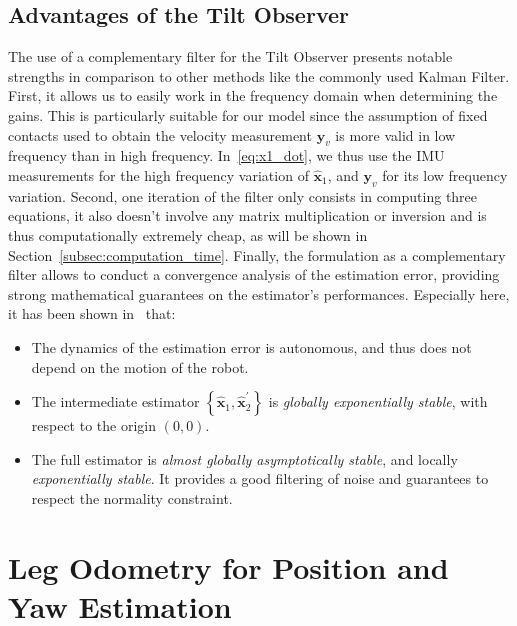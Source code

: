 \documentclass{IJCAS}
\begin{document}
\subsection{Advantages of the Tilt Observer}
The use of a complementary filter for the Tilt Observer presents notable strengths in comparison to other methods like the commonly used Kalman Filter. First, it allows us to easily work in the frequency domain when determining the gains. This is particularly suitable for our model since the assumption of fixed contacts used to obtain the velocity measurement $\boldsymbol{y}_v$ is more valid in low frequency than in high frequency. In~\eqref{eq:x1_dot}, we thus use the IMU measurements for the high frequency variation of $\hat{\boldsymbol{x}}_{1}$, and $\boldsymbol{y}_v$ for its low frequency variation. Second, one iteration of the filter only consists in computing three equations, it also doesn't involve any matrix multiplication or inversion and is thus computationally extremely cheap, as will be shown in Section~\ref{subsec:computation_time}. Finally, the formulation as a complementary filter allows to conduct a convergence analysis of the estimation error, providing strong mathematical guarantees on the estimator's performances. Especially here, it has been shown in~\cite{benallegue2020LyapunovStableOrientationEstimatorHumanoids} that:
\begin{itemize}
    \item The dynamics of the estimation error is autonomous, and thus does not depend on the motion of the robot. 
    \item The intermediate estimator $\left\{\hat{\boldsymbol{x}}_{1}, \hat{\boldsymbol{x}}_{2}^{\prime} \right\}$ is \emph{globally exponentially stable}, with respect to the origin $\left(0,0\right)$.
    \item The full estimator is \emph{almost globally asymptotically stable}, and locally \emph{exponentially stable}. It provides a good filtering of noise and guarantees to respect the normality constraint.
\end{itemize}

\section{Leg Odometry for Position and Yaw Estimation} \label{sec:leg_odometry}
\end{document}
